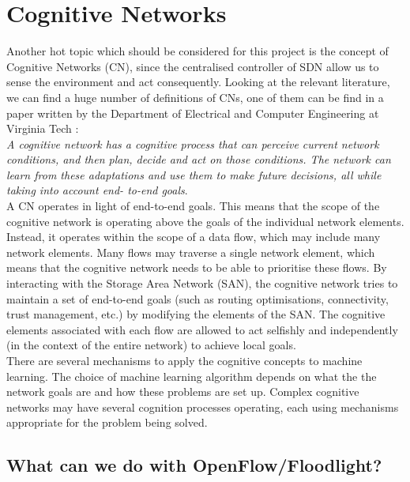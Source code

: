 \chapter{Cognitive Networks}

Another hot topic which should be considered for this project is the concept of Cognitive Networks (CN), since the centralised controller of SDN allow us to sense the environment and act consequently. Looking at the relevant literature, we can find a huge number of definitions of CNs, one of them can be find in a paper written by the Department of Electrical and Computer Engineering at Virginia Tech \cite{cognet-virginia}:\\

\emph{A cognitive network has a cognitive process that can perceive current network conditions, and then plan, decide and act on those conditions. The network can learn from these adaptations and use them to make future decisions, all while taking into account end- to-end goals}.\\


A CN operates in light of end-to-end goals. This means that the scope of the cognitive network is operating above the goals of the individual network elements. Instead, it operates within the scope of a data flow, which may include many network elements. Many flows may traverse a single network element, which means that the cognitive network needs to be able to prioritise these flows. By interacting with the Storage Area Network (SAN), the cognitive network tries to maintain a set of end-to-end goals (such as routing optimisations, connectivity, trust management, etc.) by modifying the elements of the SAN. The cognitive elements associated with each flow are allowed to act selfishly and independently (in the context of the entire network) to achieve local goals.\\

There are several mechanisms to apply the cognitive concepts to machine learning. The choice of machine learning algorithm depends on what the the network goals are and how these problems are set up. Complex cognitive networks may have several cognition processes operating, each using mechanisms appropriate for the problem being solved.\\

\newpage

\section{What can we do with OpenFlow/Floodlight?}

